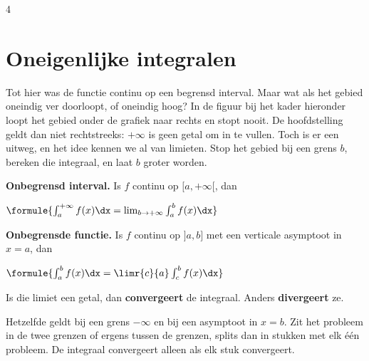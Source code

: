 \begin{alleenvoor}{4}
\section{Oneigenlijke integralen}

Tot hier was de functie continu op een begrensd interval. Maar wat als het gebied oneindig ver doorloopt, of oneindig hoog? In de figuur bij het kader hieronder loopt het gebied onder de grafiek naar rechts en stopt nooit. De hoofdstelling geldt dan niet rechtstreeks: $+\infty$ is geen getal om in te vullen. Toch is er een uitweg, en het idee kennen we al van limieten. Stop het gebied bij een grens $b$, bereken die integraal, en laat $b$ groter worden.

\begin{theorie}
\begin{minipage}[t]{.65\linewidth}
\textbf{\textcolor{accent}{Onbegrensd interval.}} Is $f$ continu op $[a, +\infty[$, dan

\vspace{1mm}
\qquad $\formule{\int_a^{+\infty} f(x)\dx = \lim_{b \to +\infty} \int_a^b f(x)\dx}$

\vspace{1.5mm}
\textbf{\textcolor{accent}{Onbegrensde functie.}} Is $f$ continu op $]a, b]$ met een verticale asymptoot in $x = a$, dan

\vspace{1mm}
\qquad $\formule{\int_a^b f(x)\dx = \limr{c}{a} \int_c^b f(x)\dx}$
\end{minipage}\hfill
\begin{minipage}[t]{.31\linewidth}
\vspace{-1mm}
\end{minipage}

\vspace{1.5mm}
Is die limiet een getal, dan \textbf{\textcolor{accent}{convergeert}} de integraal. Anders \textbf{\textcolor{accent}{divergeert}} ze.

\vspace{1mm}
Hetzelfde geldt bij een grens $-\infty$ en bij een asymptoot in $x = b$. Zit het probleem in de twee grenzen of ergens tussen de grenzen, splits dan in stukken met elk één probleem. De integraal convergeert alleen als elk stuk convergeert.
\end{theorie}


\end{alleenvoor}
